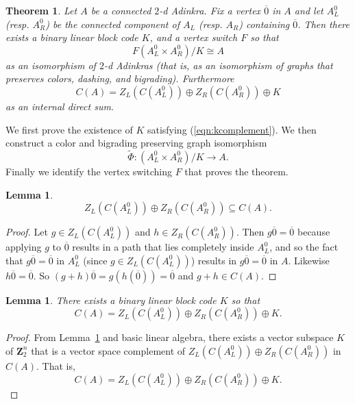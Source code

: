 \documentclass[12pt,twoside,singlespace]{article}
\numberwithin{equation}{section}
\newtheorem{thm}[equation]{Theorem}
\newtheorem{lem}[equation]{Lemma}
\theoremstyle{definition}
\newcommand{\ZZ}{\mathbf{Z}}
\begin{document}
\begin{thm}
\label{thm:quotient}
Let $A$ be a connected $2$-d Adinkra.  Fix a vertex $\overline{0}$ in $A$ and let $A_L^0$ (resp. $A_R^0$) be the connected component of $A_L$ (resp. $A_R$) containing $\overline{0}$. Then there exists a binary linear block code $K$, and a vertex switch $F$ so that
\[F(A_L^0\times A_R^0)/K\cong A\]
as an isomorphism of $2$-d Adinkras (that is, as an isomorphism of graphs that preserves colors, dashing, and bigrading).  Furthermore
\begin{equation}
\label{eqn:kcomplement}
C(A)=Z_L(C(A_L^0))\oplus Z_R(C(A_R^0))\oplus K
\end{equation}
as an internal direct sum.
\end{thm}


We first prove the existence of $K$ satisfying (\ref{eqn:kcomplement}).  We then construct a color and bigrading preserving graph isomorphism
\[\tilde{\Phi}:(A_L^0\times A_R^0)/K\to A.\]
Finally we identify the vertex switching $F$ that proves the theorem.


\begin{lem}
\label{lem:cplus}
\[Z_L(C(A_L^0))\oplus Z_R(C(A_R^0)) \subseteq C(A).\]
\end{lem}
\begin{proof}
Let $g\in Z_L(C(A_L^0))$ and $h\in Z_R(C(A_R^0))$.  Then $g\overline{0}=\overline{0}$ because applying $g$ to $\overline{0}$ results in a path that lies completely inside $A_L^0$, and so the fact that $g\overline{0}=\overline{0}$ in $A_L^0$ (since $g\in Z_L(C(A_L^0))$) results in $g\overline{0}=\overline{0}$ in $A$.  Likewise $h\overline{0}=\overline{0}$.  So $(g+h)\overline{0}=g(h(\overline{0}))=\overline{0}$ and $g+h\in C(A)$.
\end{proof}

\begin{lem}
\label{lem:existk}
There exists a binary linear block code $K$ so that
\[C(A)=Z_L(C(A_L^0))\oplus Z_R(C(A_R^0))\oplus K.
\]
\end{lem}
\begin{proof}
From Lemma~\ref{lem:cplus} and basic linear algebra, there exists a vector subspace $K$ of $\ZZ_2^n$ that is a vector space complement of
$Z_L(C(A_L^0))\oplus Z_R(C(A_R^0))$ in $C(A)$.  That is,
\[C(A)=Z_L(C(A_L^0))\oplus Z_R(C(A_R^0))\oplus K.\]
\end{proof}
\end{document}
